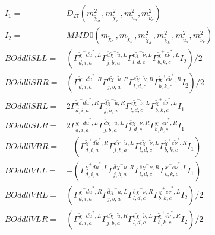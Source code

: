 \documentclass[A4,landscape]{article}
\begin{document}
\begin{align} 
I_1 = & D_{27}(m^2_{\tilde{\chi}^-_{{d}}}, m^2_{\tilde{\chi}^-_{{b}}}, m^2_{\tilde{u}_{{a}}}, m^2_{\tilde{\nu}_{{c}}}) \\ 
I_2 = & MMD0(m_{\tilde{\chi}^-_{{b}}}, m_{\tilde{\chi}^-_{{d}}}, m^2_{\tilde{\chi}^-_{{d}}}, m^2_{\tilde{\chi}^-_{{b}}}, m^2_{\tilde{u}_{{a}}}, m^2_{\tilde{\nu}_{{c}}}) \\ 
  BOddllSLL= & ( \Gamma^{\tilde{\chi}^+d \tilde{u}^*,L}_{d, i, a} \Gamma^{\bar{d}\tilde{\chi}^- \tilde{u} ,L}_{j, b, a} \Gamma^{\bar{e}\tilde{\chi}^- \tilde{\nu} ,L}_{l, d, c} \Gamma^{\tilde{\chi}^+e \tilde{\nu}^*,L}_{b, k, c} I_2)/2 \\ 
  BOddllSRR= & ( \Gamma^{\tilde{\chi}^+d \tilde{u}^*,R}_{d, i, a} \Gamma^{\bar{d}\tilde{\chi}^- \tilde{u} ,R}_{j, b, a} \Gamma^{\bar{e}\tilde{\chi}^- \tilde{\nu} ,R}_{l, d, c} \Gamma^{\tilde{\chi}^+e \tilde{\nu}^*,R}_{b, k, c} I_2)/2 \\ 
  BOddllSRL= & 2  \Gamma^{\tilde{\chi}^+d \tilde{u}^*,R}_{d, i, a} \Gamma^{\bar{d}\tilde{\chi}^- \tilde{u} ,R}_{j, b, a} \Gamma^{\bar{e}\tilde{\chi}^- \tilde{\nu} ,L}_{l, d, c} \Gamma^{\tilde{\chi}^+e \tilde{\nu}^*,L}_{b, k, c} I_1 \\ 
  BOddllSLR= & 2  \Gamma^{\tilde{\chi}^+d \tilde{u}^*,L}_{d, i, a} \Gamma^{\bar{d}\tilde{\chi}^- \tilde{u} ,L}_{j, b, a} \Gamma^{\bar{e}\tilde{\chi}^- \tilde{\nu} ,R}_{l, d, c} \Gamma^{\tilde{\chi}^+e \tilde{\nu}^*,R}_{b, k, c} I_1 \\ 
  BOddllVRR= & -( \Gamma^{\tilde{\chi}^+d \tilde{u}^*,R}_{d, i, a} \Gamma^{\bar{d}\tilde{\chi}^- \tilde{u} ,L}_{j, b, a} \Gamma^{\bar{e}\tilde{\chi}^- \tilde{\nu} ,L}_{l, d, c} \Gamma^{\tilde{\chi}^+e \tilde{\nu}^*,R}_{b, k, c} I_1) \\ 
  BOddllVLL= & -( \Gamma^{\tilde{\chi}^+d \tilde{u}^*,L}_{d, i, a} \Gamma^{\bar{d}\tilde{\chi}^- \tilde{u} ,R}_{j, b, a} \Gamma^{\bar{e}\tilde{\chi}^- \tilde{\nu} ,R}_{l, d, c} \Gamma^{\tilde{\chi}^+e \tilde{\nu}^*,L}_{b, k, c} I_1) \\ 
  BOddllVRL= & ( \Gamma^{\tilde{\chi}^+d \tilde{u}^*,R}_{d, i, a} \Gamma^{\bar{d}\tilde{\chi}^- \tilde{u} ,L}_{j, b, a} \Gamma^{\bar{e}\tilde{\chi}^- \tilde{\nu} ,R}_{l, d, c} \Gamma^{\tilde{\chi}^+e \tilde{\nu}^*,L}_{b, k, c} I_2)/2 \\ 
  BOddllVLR= & ( \Gamma^{\tilde{\chi}^+d \tilde{u}^*,L}_{d, i, a} \Gamma^{\bar{d}\tilde{\chi}^- \tilde{u} ,R}_{j, b, a} \Gamma^{\bar{e}\tilde{\chi}^- \tilde{\nu} ,L}_{l, d, c} \Gamma^{\tilde{\chi}^+e \tilde{\nu}^*,R}_{b, k, c} I_2)/2 \\ 

\end{align}
\end{document}
